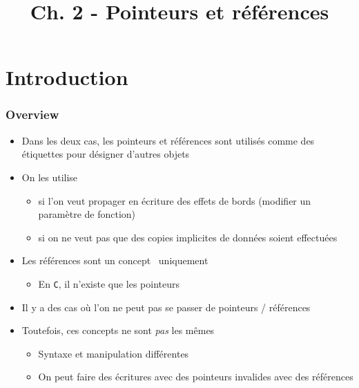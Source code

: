 


\title{Ch. 2 - Pointeurs et références}




\section{Introduction}

\begin{frame}
\frametitle{Overview}
\begin{itemize}[<+->]
\item Dans les deux cas, les pointeurs et références sont utilisés comme des étiquettes pour désigner d'autres objets
\item On les utilise 
	\begin{itemize}
	\item si l'on veut propager en écriture des effets de bords (modifier un paramètre de fonction)
	\item si on ne veut pas que des copies implicites de données soient effectuées
	\end{itemize}
\item Les références sont un concept \cpp\ uniquement
	\begin{itemize}
	\item En \texttt{C}, il n'existe que les pointeurs
	\end{itemize}
\item Il y a des cas où l'on ne peut pas se passer de pointeurs / références
\item Toutefois, ces concepts ne sont \emph{pas} les mêmes
	\begin{itemize}
	\item Syntaxe et manipulation différentes
	\item On peut faire des écritures avec des pointeurs invalides avec des références
	\end{itemize}
\end{itemize}
\end{frame}


